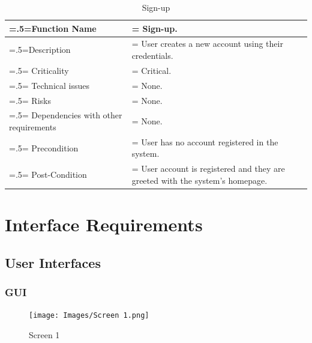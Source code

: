 \documentclass[12pt]{article}
\begin{document}
\begin{center}
    \begin{table}[H]
        \caption{Sign-up}
        \begin{tabularx}{\textwidth} {
                | >{\raggedright\arraybackslash\hsize=.5\hsize\linewidth=\hsize}X
                | >{\raggedright\arraybackslash\hsize=1.5\hsize\linewidth=\hsize}X |}
            \hline
            Function Name                        & Sign-up.                                                                    \\ \hline
            Description                          & User creates a new account using their credentials.                         \\ \hline
            Criticality                          & Critical.                                                                   \\ \hline
            Technical issues                     & None.                                                                       \\ \hline
            Risks                                & None.                                                                       \\ \hline
            Dependencies with other requirements & None.                                                                       \\ \hline
            Precondition                         & User has no account registered in the system.                               \\ \hline
            Post-Condition                       & User account is registered and they are greeted with the system's homepage. \\ \hline
        \end{tabularx}
    \end{table}
\end{center}

\section{Interface Requirements}
\subsection{User Interfaces}
\subsubsection {GUI}
\begin{figure}[H]
    \texttt{[image: Images/Screen 1.png]}
    \caption{Screen 1}
\end{figure}
\end{document}
